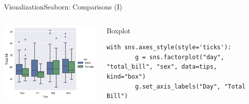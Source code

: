 \documentclass[10pt,compress]{beamer} %
\begin{document}
\begin{frame}[fragile]{Visualization}{Seaborn: Comparisons (I)}
	\begin{columns}
	\includegraphics[width=\textwidth]{figs/sns-boxplot.png}\\
	\begin{exampleblock}{\footnotesize{Boxplot}}
	\vspace{-0.2cm} 
	\begin{lstlisting}[basicstyle=\tiny]
	with sns.axes_style(style='ticks'):
	    g = sns.factorplot("day", "total_bill", "sex", data=tips, kind="box")
		g.set_axis_labels("Day", "Total Bill")
	\end{lstlisting}
	\vspace{-0.2cm} 
	\end{exampleblock}


\end{columns}
\end{frame}
\end{document}
